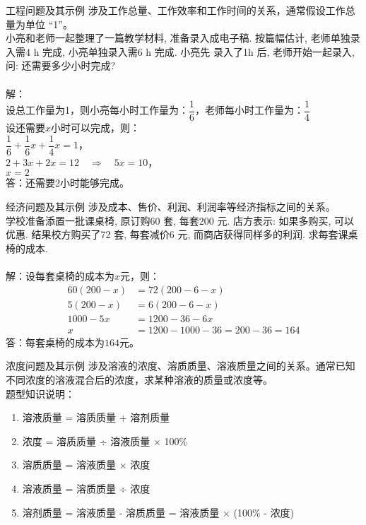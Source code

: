 \documentclass{ctexbeamer}
\begin{document}
\begin{frame}[t]{工程问题及其示例}
涉及工作总量、工作效率和工作时间的关系，通常假设工作总量为单位 “1”。\\
小亮和老师一起整理了一篇教学材料, 准备录入成电子稿. 按篇幅估计, 老师单独录入需4 h 完成, 小亮单独录入需6 h 完成. 小亮先
录入了1h 后, 老师开始一起录入, 问: 还需要多少小时完成? \\
\\
解：\\
\pause
设总工作量为1，则小亮每小时工作量为：$\dfrac{1}{6}$，老师每小时工作量为：$\dfrac{1}{4}$\\
设还需要$x$小时可以完成，则：\\
\vspace{12pt} 
$\dfrac{1}{6} + \dfrac{1}{6}x + \dfrac{1}{4}x = 1$， \\
\vspace{12pt} 
$2 + 3x + 2x = 12 \quad \Rightarrow \quad 5x = 10$， \\
\vspace{12pt} 
$x = 2$ \\
\vspace{12pt} 
答：还需要2小时能够完成。
\end{frame}

\begin{frame}[t]{经济问题及其示例}
涉及成本、售价、利润、利润率等经济指标之间的关系。\\
学校准备添置一批课桌椅, 原订购60 套, 每套200 元. 店方表示: 如果多购买, 可以优惠. 结果校方购买了72 套, 每套减价6 元, 而商店获得同样多的利润. 求每套课桌椅的成本.\\
\\
解：设每套桌椅的成本为$x$元，则：
\pause
\begin{align*}
60(200 - x) &= 72(200-6-x) \\
5(200 - x) &= 6(200 - 6 - x) \\
1000 - 5x &= 1200 - 36 - 6x \\
x &= 1200 - 1000 - 36 = 200 - 36 = 164
\end{align*}
答：每套桌椅的成本为$164$元。
\end{frame}

\begin{frame}[t]{浓度问题及其示例}
涉及溶液的浓度、溶质质量、溶液质量之间的关系。通常已知不同浓度的溶液混合后的浓度，求某种溶液的质量或浓度等。\\
题型知识说明：
\begin{enumerate}[{label=\arabic*.}]
\item 溶液质量 = 溶质质量 + 溶剂质量
\item 浓度 = 溶质质量 ÷ 溶液质量 × 100\%
\item 溶质质量 = 溶液质量 × 浓度
\item 溶液质量 = 溶质质量 ÷ 浓度
\item 溶剂质量 = 溶液质量 - 溶质质量 = 溶液质量 × (100\% - 浓度)
\end{enumerate}
\end{frame}
\end{document}
